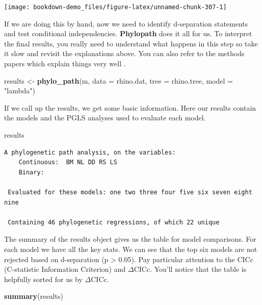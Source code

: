 \documentclass[
]{book}
\newenvironment{Shaded}{\begin{snugshade}}{\end{snugshade}}
\newcommand{\DataTypeTok}[1]{\textcolor[rgb]{0.13,0.29,0.53}{#1}}
\newcommand{\KeywordTok}[1]{\textcolor[rgb]{0.13,0.29,0.53}{\textbf{#1}}}
\newcommand{\NormalTok}[1]{#1}
\newcommand{\StringTok}[1]{\textcolor[rgb]{0.31,0.60,0.02}{#1}}
\begin{document}
\begin{center}\texttt{[image: bookdown-demo\_files/figure-latex/unnamed-chunk-307-1]} \end{center}

If we are doing this by hand, now we need to identify d-separation statements and test conditional independencies. \textbf{Phylopath} does it all for us. To interpret the final results, you really need to understand what happens in this step so take it slow and revisit the explanations above. You can also refer to the methods papers which explain things very well \citep{Hardenberg13, Gonzalez14}.

\begin{Shaded}
\begin{Highlighting}[]
\NormalTok{results \textless{}{-}}\StringTok{ }\KeywordTok{phylo\_path}\NormalTok{(m, }\DataTypeTok{data =}\NormalTok{ rhino.dat, }\DataTypeTok{tree =}\NormalTok{ rhino.tree, }\DataTypeTok{model =} \StringTok{"lambda"}\NormalTok{)}
\end{Highlighting}
\end{Shaded}

If we call up the results, we get some basic information. Here our results contain the models and the PGLS analyses used to evaluate each model.

\begin{Shaded}
\begin{Highlighting}[]
\NormalTok{results}
\end{Highlighting}
\end{Shaded}

\begin{verbatim}
A phylogenetic path analysis, on the variables:
    Continuous:  BM NL DD RS LS 
    Binary:       

 Evaluated for these models: one two three four five six seven eight nine 

 Containing 46 phylogenetic regressions, of which 22 unique
\end{verbatim}

The summary of the results object gives us the table for model comparisons. For each model we have all the key stats. We can see that the top six models are not rejected based on d-separation (p \textgreater{} 0.05). Pay particular attention to the CICc (C-statistic Information Criterion) and \(\Delta\)CICc. You'll notice that the table is helpfully sorted for us by \(\Delta\)CICc.

\begin{Shaded}
\begin{Highlighting}[]
\KeywordTok{summary}\NormalTok{(results)}
\end{Highlighting}
\end{Shaded}
\end{document}
